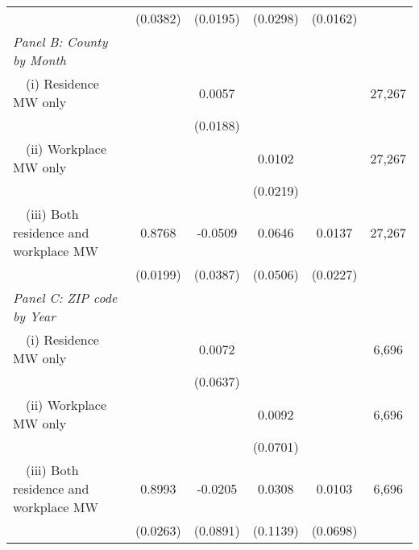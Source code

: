 \begin{landscape}
\begin{table}[ht!]
\begin{tabular}{@{}lccccc@{}}
                                                             & (0.0382) & (0.0195) & (0.0298) & (0.0162) &      \\
        \textit{Panel B: County by Month}                    &       &       &       &       &      \\
        $\quad$(i) Residence MW only                         &       &  0.0057  &       &       & 27,267 \\
                                                             &       & (0.0188) &       &       &      \\
        $\quad$(ii) Workplace MW only                        &       &       &  0.0102  &       & 27,267 \\
                                                             &       &       & (0.0219) &       &      \\
        $\quad$(iii) Both residence and workplace MW         &  0.8768  &  -0.0509  &  0.0646  &  0.0137  & 27,267 \\
                                                             & (0.0199) & (0.0387) & (0.0506) & (0.0227) &      \\
        \textit{Panel C: ZIP code by Year}                   &       &       &       &       &      \\
        $\quad$(i) Residence MW only                         &       &  0.0072  &       &       & 6,696 \\
                                                             &       & (0.0637) &       &       &      \\
        $\quad$(ii) Workplace MW only                        &       &       &  0.0092  &       & 6,696 \\
                                                             &       &       & (0.0701) &       &      \\
        $\quad$(iii) Both residence and workplace MW         &  0.8993  &  -0.0205  &  0.0308  &  0.0103  & 6,696 \\
                                                             & (0.0263) & (0.0891) & (0.1139) & (0.0698) &      \\ \bottomrule
    \end{tabular}
    

\end{table}
\end{landscape}
